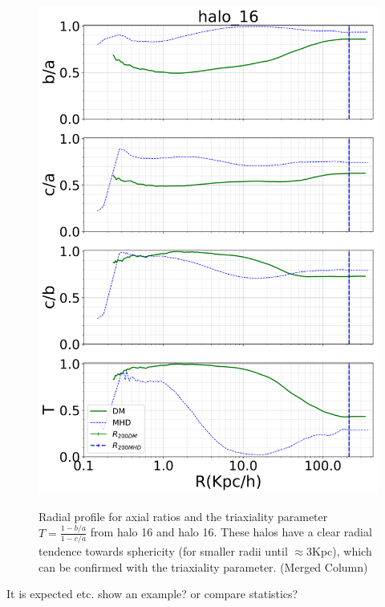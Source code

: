 \documentclass[a4paper,fleqn,usenatbib]{mnras}
\begin{document}
\begin{figure}
\centering
{\includegraphics[width=0.8\columnwidth]{./pics/halo16.png}}
\caption{Radial profile for axial ratios and the triaxiality parameter $T=\frac{1-b/a}{1-c/a}$ from halo 16 and halo 16. These halos have a clear radial tendence towards sphericity (for smaller radii until $\approx 3$Kpc), which can be confirmed with the triaxiality parameter. (Merged Column)}
\label{fig:DM_MHD}
\end{figure} 

It is expected etc. show an example? or compare statistics? 
\end{document}

